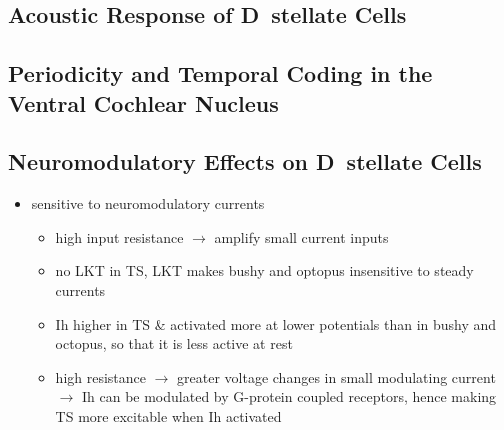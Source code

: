 \subsection{Acoustic Response of D~stellate  Cells}







\subsection{Periodicity and Temporal Coding in the Ventral Cochlear Nucleus}






\subsection{Neuromodulatory Effects on D~stellate Cells}




\begin{itemize}
\item sensitive to neuromodulatory currents \citep{FujinoOertel:2001}
\begin{itemize}
\item high input resistance $\rightarrow$ amplify small current inputs \citep{FujinoOertel:2001}
\item no LKT in TS,  LKT makes bushy and optopus insensitive to steady currents \citep{OertelFujino:2001,McGinleyOertel:2006}
\item Ih higher in TS \& activated more at lower potentials than in bushy and octopus, so that it is less active at rest
\item high resistance $\rightarrow$ greater voltage changes in small modulating current $\rightarrow$ Ih can be modulated by G-protein coupled receptors, hence making TS more excitable when Ih activated \citep{RodriguesOertel:2006}
\end{itemize}
\end{itemize}

